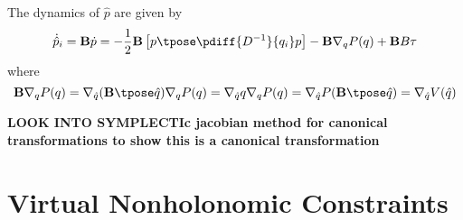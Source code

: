 The dynamics of \(\hat{p}\) are given by
\[
    \dot{\hat{p}}_i = \mathbf{B}\dot{p}
                    = -\frac{1}{2}\mathbf{B}
                    \left[p\tpose \pdiff{D^{-1}}{q_i}p\right]
                    -\mathbf{B} \nabla_q P(q) + \mathbf{B}B \tau
\]
where 
\[
    \mathbf{B} \nabla_q P(q)
    = \nabla_{\hat{q}}(\mathbf{B}\tpose \hat{q})\nabla_q P(q)
    = \nabla_{\hat{q}}q \nabla_q P(q)
    = \nabla_{\hat{q}}P(\mathbf{B}\tpose\hat{q}) 
    = \nabla_{\hat{q}} V(\hat{q}) 
\]

\textbf{LOOK INTO SYMPLECTIc jacobian method for canonical transformations to
show this is a canonical transformation}


\section{Virtual Nonholonomic Constraints}



























